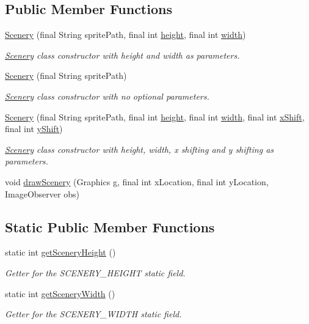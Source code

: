 \subsection*{Public Member Functions}
\begin{DoxyCompactItemize}
\item 
\hyperlink{a00024_a5d81bf38557186468da4cd02418aa438}{Scenery} (final String sprite\-Path, final int \hyperlink{a00024_a54b4edfa060087e78a829105bf62a900}{height}, final int \hyperlink{a00024_ad10b27080954e2fc06aa1718f47c4ce1}{width})
\begin{DoxyCompactList}\small\item\em \hyperlink{a00024}{Scenery} class constructor with height and width as parameters. \end{DoxyCompactList}\item 
\hyperlink{a00024_ae902f14479de352e82b78b4bac6173a1}{Scenery} (final String sprite\-Path)
\begin{DoxyCompactList}\small\item\em \hyperlink{a00024}{Scenery} class constructor with no optional parameters. \end{DoxyCompactList}\item 
\hyperlink{a00024_acdcbdff884b9910e4afa40276751cf14}{Scenery} (final String sprite\-Path, final int \hyperlink{a00024_a54b4edfa060087e78a829105bf62a900}{height}, final int \hyperlink{a00024_ad10b27080954e2fc06aa1718f47c4ce1}{width}, final int \hyperlink{a00024_a0999f105f7630fd67fd9d440da6983aa}{x\-Shift}, final int \hyperlink{a00024_ac9ca2c17cf6920deffe490c013b0e638}{y\-Shift})
\begin{DoxyCompactList}\small\item\em \hyperlink{a00024}{Scenery} class constructor with height, width, x shifting and y shifting as parameters. \end{DoxyCompactList}\item 
void \hyperlink{a00024_a626c1ae7fa15d2f96d564c35368fdbc9}{draw\-Scenery} (Graphics g, final int x\-Location, final int y\-Location, Image\-Observer obs)
\end{DoxyCompactItemize}
\subsection*{Static Public Member Functions}
\begin{DoxyCompactItemize}
\item 
static int \hyperlink{a00024_ad49a4c8ba7e7c464b49b30efea953a66}{get\-Scenery\-Height} ()
\begin{DoxyCompactList}\small\item\em Getter for the S\-C\-E\-N\-E\-R\-Y\-\_\-\-H\-E\-I\-G\-H\-T static field. \end{DoxyCompactList}\item 
static int \hyperlink{a00024_ab0ba1fc1e7266f25ac7b1b7d36d2b5b8}{get\-Scenery\-Width} ()
\begin{DoxyCompactList}\small\item\em Getter for the S\-C\-E\-N\-E\-R\-Y\-\_\-\-W\-I\-D\-T\-H static field. \end{DoxyCompactList}\end{DoxyCompactItemize}
